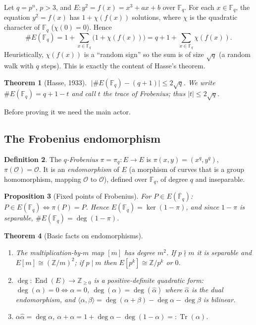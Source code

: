 \documentclass[11pt,a4paper,oneside]{book}
\theoremstyle{plain}
\newtheorem{theorem}{Theorem}[chapter]
\newtheorem{proposition}[theorem]{Proposition}
\theoremstyle{definition}
\newtheorem{definition}[theorem]{Definition}
\theoremstyle{remark}
\newcommand{\Z}{\mathbb{Z}}
\newcommand{\Fq}{\mathbb{F}_q}
\newcommand{\Fqbar}{\overline{\mathbb{F}}_q}
\newcommand{\Oinf}{\mathcal{O}}
\newcommand{\End}{\operatorname{End}}
\newcommand{\Tr}{\operatorname{Tr}}
\begin{document}
Let $q=p^n$, $p>3$, and $E:y^2=f(x)=x^3+ax+b$ over $\Fq$. For each $x\in\Fq$, the equation $y^2=f(x)$ has $1+\chi(f(x))$ solutions, where $\chi$ is the quadratic character of $\Fq$ ($\chi(0)=0$). Hence
\begin{equation}\label{eq:legendre-count}
\#E(\Fq)=1+\sum_{x\in\Fq}\big(1+\chi(f(x))\big)=q+1+\sum_{x\in\Fq}\chi(f(x)).
\end{equation}
Heuristically, $\chi(f(x))$ is a ``random sign'' so the sum is of size $\sqrt q$ (a random walk with $q$ steps). This is exactly the content of Hasse's theorem.

\begin{theorem}[Hasse, 1933]\label{thm:hasse}
$\;\big|\#E(\Fq)-(q+1)\big|\le2\sqrt q$. We write $\#E(\Fq)=q+1-t$ and call $t$ the \emph{trace of Frobenius}; thus $|t|\le2\sqrt q$.
\end{theorem}

Before proving it we need the main actor.

\subsection{The Frobenius endomorphism}

\begin{definition}
The \emph{$q$-Frobenius} $\pi=\pi_q:E\to E$ is $\pi(x,y)=(x^q,y^q)$, $\pi(\Oinf)=\Oinf$. It is an \emph{endomorphism} of $E$ (a morphism of curves that is a group homomorphism, mapping $\Oinf$ to $\Oinf$), defined over $\Fq$, of degree $q$ and inseparable.
\end{definition}

\begin{proposition}[Fixed points of Frobenius]\label{prop:fixed}
For $P\in E(\Fqbar)$: $P\in E(\Fq)\iff\pi(P)=P$. Hence $E(\Fq)=\ker(1-\pi)$, and since $1-\pi$ is separable, $\#E(\Fq)=\deg(1-\pi)$.
\end{proposition}

\begin{theorem}[Basic facts on endomorphisms]\label{thm:deg-n}
\begin{enumerate}[nosep,label=(\roman*)]
\item The multiplication-by-$m$ map $[m]$ has degree $m^2$. If $p\nmid m$ it is separable and $E[m]\cong(\Z/m)^2$; if $p\mid m$ then $E[p^k]\cong\Z/p^k$ or $0$.
\item $\deg:\End(E)\to\Z_{\ge0}$ is a positive-definite quadratic form: $\deg(\alpha)=0\iff\alpha=0$, $\deg(\alpha)=\deg(\hat\alpha)$ where $\hat\alpha$ is the dual endomorphism, and $\langle\alpha,\beta\rangle=\deg(\alpha+\beta)-\deg\alpha-\deg\beta$ is bilinear.
\item $\alpha\hat\alpha=\deg\alpha$, $\alpha+\hat\alpha=1+\deg\alpha-\deg(1-\alpha)=:\Tr(\alpha)$.
\end{enumerate}
\end{theorem}
\end{document}
